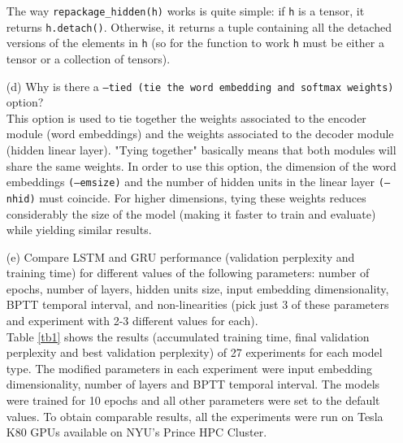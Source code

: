 \documentclass{article}
\begin{document}
\begin{itemize}
    The way \texttt{repackage\_hidden(h)} works is quite simple: if \texttt{h} is a tensor, it returns \texttt{h.detach()}. Otherwise, it returns a tuple containing all the detached versions of the elements in \texttt{h} (so for the function to work \texttt{h} must be either a tensor or a collection of tensors).\\
    \item[(d)] Why is there a \texttt{---tied (tie the word embedding and softmax weights)} option?\\
    This option is used to tie together the weights associated to the encoder module (word embeddings) and the weights associated to the decoder module (hidden linear layer). "Tying together" basically means that both modules will share the same weights. In order to use this option, the dimension of the word embeddings \texttt{(---emsize)} and the number of hidden units in the linear layer \texttt{(---nhid)} must coincide. For higher dimensions, tying these weights reduces considerably the size of the model (making it faster to train and evaluate) while yielding similar results.\\
    \item[(e)] Compare LSTM and GRU performance (validation perplexity and training time) for different values of the following parameters: number of epochs, number of layers, hidden units size, input embedding dimensionality, BPTT temporal interval, and non-linearities (pick just 3 of these parameters and experiment with 2-3 different values for each).\\
    Table \ref{tb1} shows the results (accumulated training time, final validation perplexity and best validation perplexity) of 27 experiments for each model type. The modified parameters in each experiment were input embedding dimensionality, number of layers and BPTT temporal interval. The models were trained for 10 epochs and all other parameters were set to the default values. To obtain comparable results, all the experiments were run on Tesla K80 GPUs available on NYU's Prince HPC Cluster.\\
    

\end{itemize}
\end{document}
